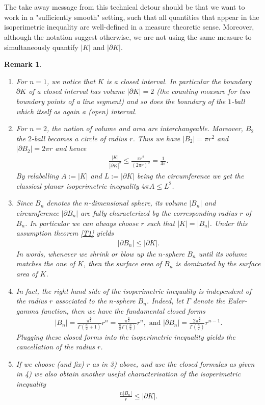 \documentclass[12pt, a4paper, titlepage]{article}
\newtheorem{remark}{Remark}
\begin{document}
\\\\
The take away message from this technical detour should be that we want to work in a "sufficiently smooth" setting, such that all quantities that appear in the isoperimetric inequality are well-defined in a measure theoretic sense. Moreover, although the notation suggest otherwise, we are not using the same measure to simultaneously quantify $|K|$ and $| \partial K|$. 
\begin{remark} \label{R1} \
\begin{enumerate}
\item For $n=1$, we notice that $K$ is a closed interval. In particular the boundary $\partial K$ of a closed interval has volume $| \partial K|=2$ (the counting measure for two boundary points of a line segment) and so does the boundary of the $1$-ball which itself as again a (open) interval. 
\item For $n=2$, the notion of volume and area are interchangeable. Moreover, $B_2$ the $2$-ball becomes a circle of radius $r$. Thus we have $|B_2|= \pi r^2$ and $| \partial B_2|= 2 \pi r$ and hence 
\begin{align*}
\frac{|K|}{| \partial K|^2} \leq \frac{\pi r^2}{(2 \pi r)^2} = \frac{1}{4 \pi}.
\end{align*}
By relabelling $A:=|K|$ and $L:= | \partial K|$ being the circumference we get the classical planar isoperimetric inequality $4 \pi A \leq L^2$. 
\item Since $B_n$ denotes the $n$-dimensional sphere, its volume $|B_n|$ and circumference $| \partial B_n|$ are fully characterized by the corresponding radius $r$ of $B_n$. In particular we can always choose $r$ such that $|K|= |B_n|$. Under this assumption theorem \ref{T1} yields 
\begin{align*}
| \partial B_n| \leq | \partial K|.
\end{align*}
In words, whenever we shrink or blow up the $n$-sphere $B_n$ until its volume matches the one of $K$, then the surface area of $B_n$ is dominated by the surface area of $K$. 
\item In fact, the right hand side of the isoperimetric inequality is independent of the radius $r$ associated to the $n$-sphere $B_n$. Indeed, let $\Gamma$ denote the Euler-gamma function, then we have the fundamental closed forms 
\begin{align*}
|B_n| = \frac{\pi^\frac{n}{2}}{\Gamma \left( \frac{n}{2}+1\right)}r^n =\frac{\pi^\frac{n}{2}}{ \frac{n}{2}\Gamma \left( \frac{n}{2}\right)}r^n, \text{ and } | \partial B_n|  = \frac{2 \pi ^\frac{n}{2}}{\Gamma \left( \frac{n}{2}\right)}r^{n-1}.
\end{align*}
Plugging these closed forms into the isoperimetric inequality yields the cancellation of the radius $r$.
\item  If we choose (and fix) $r$ as in 3) above, and use the closed formulas as given in 4) we also obtain another useful characterisation of the isoperimetric inequality \begin{align*}
\frac{n|B_n|}{r} \leq  | \partial K|. 
\end{align*}
\end{enumerate}
\end{remark}
\end{document}
